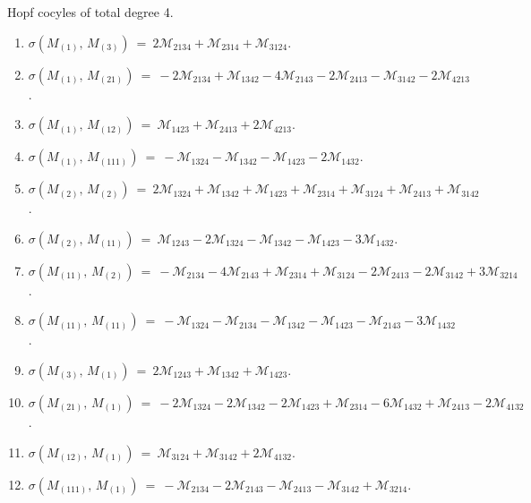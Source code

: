 \documentclass[12pt]{article}
\newcommand{\M}{\mathcal{M}}
\begin{document}
Hopf cocyles of total degree 4.
\begin{enumerate}
\item[]\hspace{-50pt}$\sigma(M_{(1)},\,M_{(3)})\ =\ 
        2\M_{2134} +\M_{2314} 
       +\M_{3124} $.\vspace{-8pt}
\item[]\hspace{-50pt}$\sigma(M_{(1)},\,M_{(21)})\ =\ 
        -2\M_{2134} +\M_{1342} 
       -4\M_{2143} -2\M_{2413} 
       -\M_{3142} -2\M_{4213} $.\vspace{-8pt}
\item[]\hspace{-50pt}$\sigma(M_{(1)},\,M_{(12)})\ =\ 
        \M_{1423} +\M_{2413} 
       +2\M_{4213} $.\vspace{-8pt}
\item[]\hspace{-50pt}$\sigma(M_{(1)},\,M_{(111)})\ =\ 
        -\M_{1324} -\M_{1342} 
       -\M_{1423} -2\M_{1432} $.\vspace{-8pt}
\item[]\hspace{-50pt}$\sigma(M_{(2)},\,M_{(2)})\ =\ 
        2\M_{1324} +\M_{1342} 
       +\M_{1423} +\M_{2314} 
       +\M_{3124} +\M_{2413} 
       +\M_{3142} $.\vspace{-8pt}
\item[]\hspace{-50pt}$\sigma(M_{(2)},\,M_{(11)})\ =\ 
        \M_{1243} -2\M_{1324} 
       -\M_{1342} -\M_{1423} 
       -3\M_{1432} $.\vspace{-8pt}
\item[]\hspace{-50pt}$\sigma(M_{(11)},\,M_{(2)})\ =\ 
        -\M_{2134} -4\M_{2143} 
       +\M_{2314} +\M_{3124} 
       -2\M_{2413} -2\M_{3142} 
       +3\M_{3214} $.\vspace{-8pt}
\item[]\hspace{-50pt}$\sigma(M_{(11)},\,M_{(11)})\ =\ 
        -\M_{1324} -\M_{2134} 
       -\M_{1342} -\M_{1423} 
       -\M_{2143} -3\M_{1432} $.\vspace{-8pt}
\item[]\hspace{-50pt}$\sigma(M_{(3)},\,M_{(1)})\ =\ 
        2\M_{1243} +\M_{1342} 
       +\M_{1423} $.\vspace{-8pt}
\item[]\hspace{-50pt}$\sigma(M_{(21)},\,M_{(1)})\ =\ 
        -2\M_{1324} -2\M_{1342} 
       -2\M_{1423} +\M_{2314} 
       -6\M_{1432} +\M_{2413} 
       -2\M_{4132} $.\vspace{-8pt}
\item[]\hspace{-50pt}$\sigma(M_{(12)},\,M_{(1)})\ =\ 
        \M_{3124} +\M_{3142} 
       +2\M_{4132} $.\vspace{-8pt}
\item[]\hspace{-50pt}$\sigma(M_{(111)},\,M_{(1)})\ =\ 
        -\M_{2134} -2\M_{2143} 
       -\M_{2413} -\M_{3142} 
       +\M_{3214} $.\vspace{-8pt}
\end{enumerate}
\end{document}
